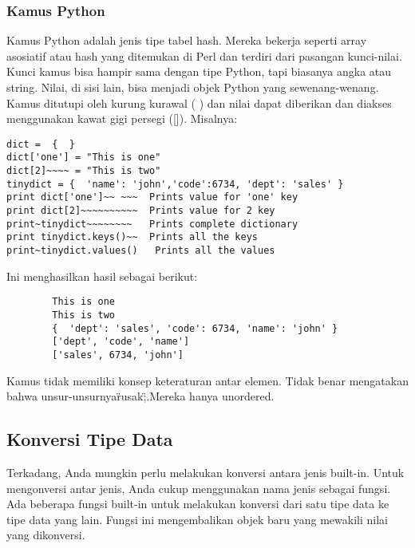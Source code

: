 \subsubsection{Kamus Python}
	Kamus Python adalah jenis tipe tabel hash. Mereka bekerja seperti array asosiatif atau hash yang ditemukan di Perl dan terdiri dari pasangan kunci-nilai. Kunci kamus bisa hampir sama dengan tipe Python, tapi biasanya angka atau string. Nilai, di sisi lain, bisa menjadi objek Python yang sewenang-wenang. 
Kamus ditutupi oleh kurung kurawal ( {  } ) dan nilai dapat diberikan dan diakses menggunakan kawat gigi persegi ([]). 
Misalnya:
\begin{verbatim}
dict =  {  } 
dict['one'] = "This is one"
dict[2]~~~~ = "This is two" 
tinydict = {  'name': 'john','code':6734, 'dept': 'sales' }  
print dict['one']~~ ~~~  Prints value for 'one' key 
print dict[2]~~~~~~~~~~  Prints value for 2 key 
print~tinydict~~~~~~~~   Prints complete dictionary
print tinydict.keys()~~  Prints all the keys 
print~tinydict.values()   Prints all the values 
\end{verbatim}
Ini menghasilkan hasil sebagai berikut:
	\begin{verbatim}
		This is one 
		This is two 
		{  'dept': 'sales', 'code': 6734, 'name': 'john' } 
		['dept', 'code', 'name'] 
		['sales', 6734, 'john'] 
	\end{verbatim}
Kamus tidak memiliki konsep keteraturan antar elemen. Tidak benar mengatakan bahwa unsur-unsurnya\"rusak\";.Mereka hanya unordered. 
\subsection{Konversi Tipe Data}
Terkadang, Anda mungkin perlu melakukan konversi antara jenis built-in. Untuk mengonversi antar jenis, Anda cukup menggunakan nama jenis sebagai fungsi. 
Ada beberapa fungsi built-in untuk melakukan konversi dari satu tipe data ke tipe data yang lain. $  $Fungsi ini mengembalikan objek baru yang mewakili nilai yang dikonversi. 

